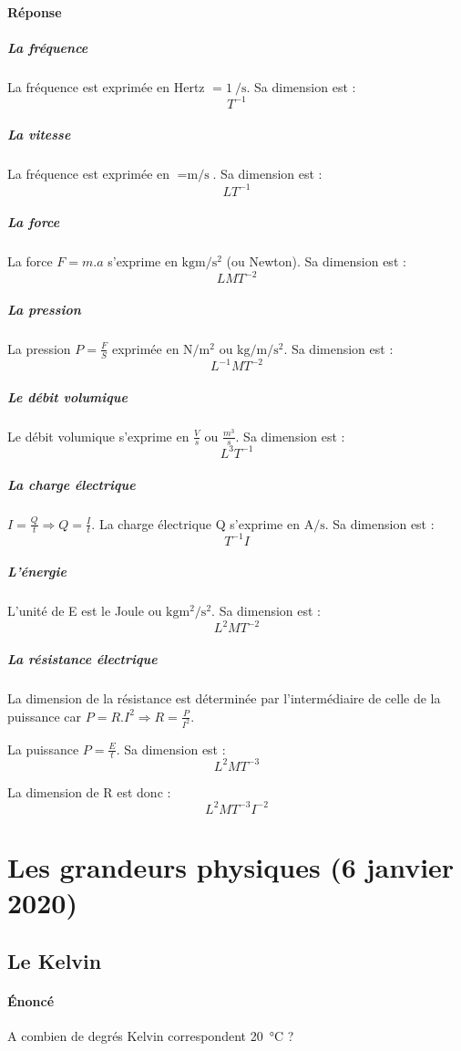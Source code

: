 \documentclass{article}
\begin{document}
\newpage
\paragraph{Réponse}
\subparagraph{La fréquence}
La fréquence est exprimée en Hertz $= \SI{1}{\per \second}$. Sa dimension est : $$T^{-1}$$

\subparagraph{La vitesse}
La fréquence est exprimée en $= \si{\meter \per \second}$. Sa dimension est : $$LT^{-1}$$

\subparagraph{La force}
La force $F = m.a$ s'exprime en $\si{\kilogram \meter \per \square \second}$ (ou Newton). Sa dimension est : $$LMT^{-2}$$

\subparagraph{La pression}
La pression $P = \frac{F}{S}$ exprimée en $\si{\newton \per \square \meter}$ ou $\si{\kilogram \per \meter \per \square \second}$. Sa dimension est : $$L^{-1}MT^{-2}$$

\subparagraph{Le débit volumique}
Le débit volumique s'exprime en $\frac{V}{s}$ ou $\frac{m^3}{s}$. Sa dimension est : $$L^3T^{-1}$$

\subparagraph{La charge électrique}
$I = \frac{Q}{t} \Rightarrow Q = \frac{I}{t}$. La charge électrique Q s'exprime en $\si{\ampere \per \second}$. Sa dimension est : $$T^{-1}I$$

\subparagraph{L'énergie}
L'unité de E est le Joule ou $\si{\kilogram \square \meter \per \square \second}$. Sa dimension est : $$L^2MT^{-2}$$

\subparagraph{La résistance électrique}
La dimension de la résistance est déterminée par l'intermédiaire de celle de la puissance car $P = R.I^2 \Rightarrow R = \frac{P}{I^2}$.

La puissance $P = \frac{E}{t}$. Sa dimension est : $$L^2MT^{-3}$$

La dimension de R est donc : $$L^2MT^{-3}I^{-2}$$

\newpage
\section{Les grandeurs physiques (6 janvier 2020)}
\subsection{Le Kelvin}
\paragraph{Énoncé}
A combien de degrés Kelvin correspondent \SI{20}{\celsius} ?
\end{document}
